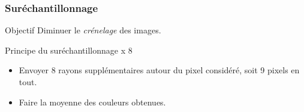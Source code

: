 \begin{frame}
\frametitle{Suréchantillonnage}

\begin{block}{Objectif}
Diminuer le \emph{crénelage} des images.
\end{block}

\begin{block}{Principe du suréchantillonnage x 8}
\begin{itemize}
\item \pause Envoyer 8 rayons supplémentaires autour du pixel considéré, soit 9 pixels en tout.
\item \pause Faire la moyenne des couleurs obtenues.
\end{itemize}
\end{block}
\end{frame}

